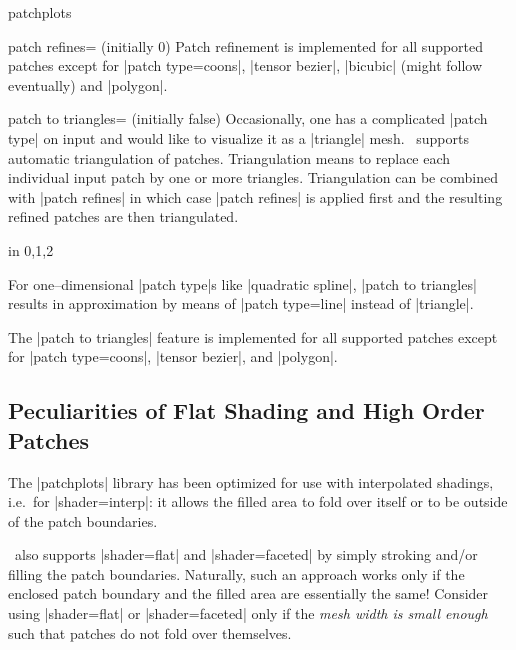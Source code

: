 {\begin{pgfplotslibrary}{patchplots}
\begin{pgfplotskey}{patch refines= (initially 0)}
	Patch refinement is implemented for all supported patches except for |patch type=coons|, |tensor bezier|, |bicubic| (might follow eventually) and |polygon|.
\end{pgfplotskey}

\begin{pgfplotskey}{patch to triangles= (initially false)}
	Occasionally, one has a complicated |patch type| on input and would like to visualize it as a |triangle| mesh. \PGFPlots\ supports automatic triangulation of patches. Triangulation means to replace each individual input patch by one or more triangles. Triangulation can be combined with |patch refines| in which case |patch refines| is applied first and the resulting refined patches are then triangulated.
\begin{codeexample}[]
\foreach \level in {0,1,2} {%
}
\end{codeexample}
	
	For one--dimensional |patch type|s like |quadratic spline|, |patch to triangles| results in approximation by means of |patch type=line| instead of |triangle|. 

	The |patch to triangles| feature is implemented for all supported patches except for |patch type=coons|, |tensor bezier|, and |polygon|.
\end{pgfplotskey}

\subsection{Peculiarities of Flat Shading and High Order Patches}
\label{sec:lib:patchplots:flat}
The |patchplots| library has been optimized for use with interpolated shadings, i.e.\ for |shader=interp|: it allows the filled area to fold over itself or to be outside of the patch boundaries.

\PGFPlots\ also supports |shader=flat| and |shader=faceted| by simply stroking and/or filling the patch boundaries. Naturally, such an approach works only if the enclosed patch boundary and the filled area are essentially the same! Consider using |shader=flat| or |shader=faceted| only if the \emph{mesh width is small enough} such that patches do not fold over themselves.


\end{pgfplotslibrary}}
